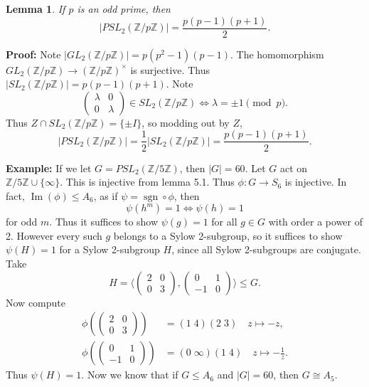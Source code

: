 \documentclass[12pt]{article}
\DeclareMathOperator{\Img}{Im}
\DeclareMathOperator{\sgn}{sgn}
\newtheorem{lemma}{Lemma}[section]
\theoremstyle{definition}
\theoremstyle{remark}
\begin{document}
\begin{lemma}
	If $p$ is an odd prime, then
	\[
		|PSL_2(\mathbb{Z}/p \mathbb{Z})| = \frac{p(p-1)(p+1)}{2}
	.\]
\end{lemma}

\begin{adjustbox}{minipage = \columnwidth - 25.5pt, margin=1em, frame=1pt, margin=0em}
	\textbf{Proof:} Note $|GL_2(\mathbb{Z} / p \mathbb{Z})| = p(p^2-1)(p-1)$. The homomorphism $GL_2(\mathbb{Z}/p \mathbb{Z}) \to (\mathbb{Z} / p \mathbb{Z})^{\times}$ is surjective. Thus $|SL_2(\mathbb{Z} / p \mathbb{Z})| = p(p-1)(p+1)$. Note
	\[
	\begin{pmatrix}
		\lambda & 0 \\
		0 & \lambda
	\end{pmatrix}
	\in SL_2(\mathbb{Z} / p \mathbb{Z}) \iff \lambda = \pm 1 \pmod p
	.\]
	Thus $Z \cap SL_2(\mathbb{Z} / p \mathbb{Z}) = \{\pm I\}$, so modding out by $Z$,
	\[
		|PSL_2(\mathbb{Z}/ p \mathbb{Z})| = \frac{1}{2} |SL_2(\mathbb{Z} / p \mathbb{Z})| = \frac{p(p-1)(p+1)}{2}
	.\]
\end{adjustbox}

\textbf{Example:} If we let $G = PSL_2(\mathbb{Z} / 5 \mathbb{Z})$, then $|G| = 60$. Let $G$ act on $\mathbb{Z} / 5 \mathbb{Z} \cup \{\infty\}$. This is injective from lemma 5.1. Thus $\phi : G \to S_6$ is injective. In fact, $\Img(\phi) \leq A_6$, as if $\psi = \sgn \circ \phi$, then
\[
	\psi(h^{m}) = 1 \iff \psi(h) = 1
\]
for odd $m$. Thus it suffices to show $\psi(g) = 1$ for all $g \in G$ with order a power of 2. However every such $g$ belongs to a Sylow 2-subgroup, so it suffices to show $\psi(H) = 1$ for a Sylow 2-subgroup $H$, since all Sylow 2-subgroups are conjugate. Take
\[
H = \langle
\begin{pmatrix}
	2 & 0 \\
	0 & 3
\end{pmatrix}
,
\begin{pmatrix}
	0 & 1 \\
	-1 & 0
\end{pmatrix}
\rangle \leq G
.\]
Now compute
\begin{align*}
	\phi \left(
		\begin{pmatrix}
			2 & 0 \\
			0 & 3
		\end{pmatrix}
	\right)
	&= (1\; 4)(2\; 3) \quad z \mapsto -z, \\
	\phi \left(
		\begin{pmatrix}
			0 & 1 \\
			-1 & 0
		\end{pmatrix}
	\right)
	&= (0\; \infty)(1\; 4) \quad z \mapsto -\frac{1}{z}.
\end{align*}
Thus $\psi(H) = 1$. Now we know that if $G \leq A_6$ and $|G| = 60$, then $G \cong A_5$.
\end{document}
